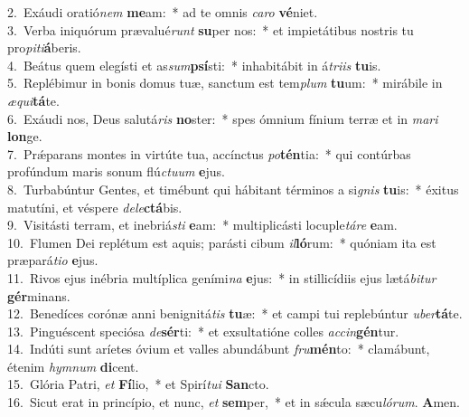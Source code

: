 {2.~}Exáudi oratió\textit{nem} \textbf{me}am:~* ad te omnis \textit{ca}\textit{ro} \textbf{vé}niet.\\
{3.~}Verba iniquórum prævalué\textit{runt} \textbf{su}per nos:~* et impietátibus nostris tu pro\textit{pi}\textit{ti}\textbf{á}beris.\\
{4.~}Beátus quem elegísti et as\textit{sum}\textbf{psí}sti:~* inhabitábit in á\textit{tri}\textit{is} \textbf{tu}is.\\
{5.~}Replébimur in bonis domus tuæ, sanctum est tem\textit{plum} \textbf{tu}um:~* mirábile in \textit{æ}\textit{qui}\textbf{tá}te.\\
{6.~}Exáudi nos, Deus salutá\textit{ris} \textbf{no}ster:~* spes ómnium fínium terræ et in \textit{ma}\textit{ri} \textbf{lon}ge.\\
{7.~}Prǽparans montes in virtúte tua, accínctus \textit{po}\textbf{tén}tia:~* qui contúrbas profúndum maris sonum flú\textit{ctu}\textit{um} \textbf{e}jus.\\
{8.~}Turbabúntur Gentes, et timébunt qui hábitant términos a si\textit{gnis} \textbf{tu}is:~* éxitus matutíni, et véspere \textit{de}\textit{le}\textbf{ctá}bis.\\
{9.~}Visitásti terram, et inebriá\textit{sti} \textbf{e}am:~* multiplicásti locuple\textit{tá}\textit{re} \textbf{e}am.\\
{10.~}Flumen Dei replétum est aquis; parásti cibum \textit{il}\textbf{ló}rum:~* quóniam ita est præpará\textit{ti}\textit{o} \textbf{e}jus.\\
{11.~}Rivos ejus inébria multíplica geními\textit{na} \textbf{e}jus:~* in stillicídiis ejus lætá\textit{bi}\textit{tur} \textbf{gér}minans.\\
{12.~}Benedíces corónæ anni benignitá\textit{tis} \textbf{tu}æ:~* et campi tui replebúntur \textit{u}\textit{ber}\textbf{tá}te.\\
{13.~}Pinguéscent speciósa \textit{de}\textbf{sér}ti:~* et exsultatióne colles \textit{ac}\textit{cin}\textbf{gén}tur.\\
{14.~}Indúti sunt aríetes óvium et valles abundábunt \textit{fru}\textbf{mén}to:~* clamábunt, étenim \textit{hym}\textit{num} \textbf{di}cent.\\
{15.~}Glória Patri, \textit{et} \textbf{Fí}lio,~* et Spirí\textit{tu}\textit{i} \textbf{San}cto.\\
{16.~}Sicut erat in princípio, et nunc, \textit{et} \textbf{sem}per,~* et in sǽcula sæcu\textit{ló}\textit{rum}. \textbf{A}men.\\
